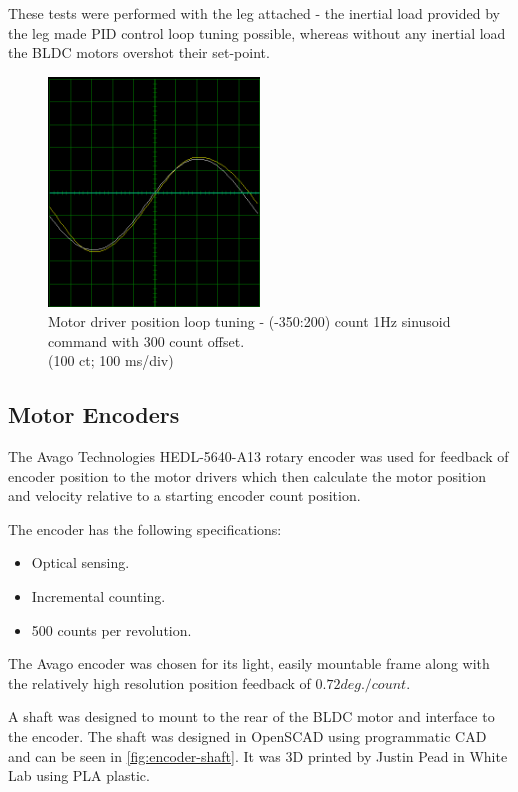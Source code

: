 These tests were performed with the leg attached - the inertial load provided by the leg made PID control loop tuning possible, whereas without any inertial load the BLDC motors overshot their set-point.

\begin{figure}
\centering
\includegraphics[width=0.5\textwidth]{images/driveware/position-tuning-plot} 
\caption{Motor driver position loop tuning - (-350:200) count 1Hz sinusoid command with 300 count offset.\\(100 ct; 100 ms/div)}
\label{fig:position-tuning-plots}
\end{figure}

\subsection{Motor Encoders}
\label{sec:motor-encoders}

The Avago Technologies HEDL-5640-A13 rotary encoder was used for feedback of encoder position to the motor drivers which then calculate the motor position and velocity relative to a starting encoder count position. 

The encoder has the following specifications:
\begin{itemize}
\item Optical sensing.
\item Incremental counting.
\item 500 counts per revolution.
\end{itemize}

The Avago encoder was chosen for its light, easily mountable frame along with the relatively high resolution position feedback of $0.72 deg./count$.
 
A shaft was designed to mount to the rear of the BLDC motor and interface to the encoder. The shaft was designed in OpenSCAD using programmatic CAD and can be seen in \cref{fig:encoder-shaft}. It was 3D printed by Justin Pead in White Lab using PLA plastic. 

